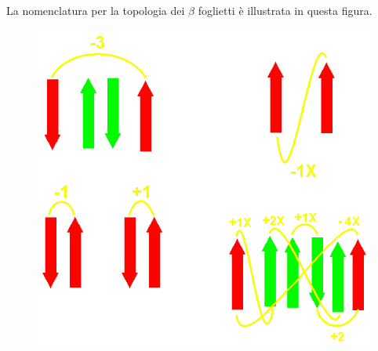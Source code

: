 \documentclass{beamer}
\begin{document}
\begin{frame}
La nomenclatura\citep{richardsonbeta} per la topologia dei $\beta$ foglietti è illustrata in questa figura.
\begin{figure}\includegraphics[scale=0.25]{betasheetcodici.png}\end{figure}  
\end{frame}
\end{document}
